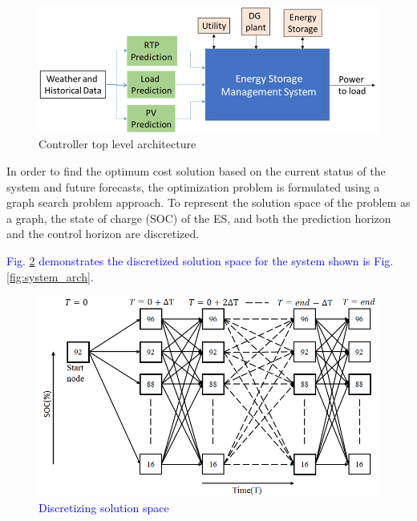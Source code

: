 \begin{figure}[!ht]
    \centering
    \includegraphics[width = 0.8\linewidth]{figs/EMS_FIG.png}
    \caption{Controller top level architecture}
    \label{fig:F1_CA}
\end{figure}

In order to find the optimum cost solution based on the current status of the system and future forecasts, the optimization problem is formulated using a graph search problem approach. To represent the solution space of the problem as a graph, the state of charge (SOC) of the ES, and both the prediction horizon and the control horizon are discretized. \textcolor{blue}{Fig. \ref{fig:F1_Dis} demonstrates the discretized solution space for the system shown is Fig. \ref{fig:system_arch}.
\begin{figure}[!ht]
    \centering
    \includegraphics[width = 0.8\linewidth]{figs/NEW_GRAPH_SEARCH.png}
    \caption{Discretizing solution space}
    \label{fig:F1_Dis}
\end{figure}
}
